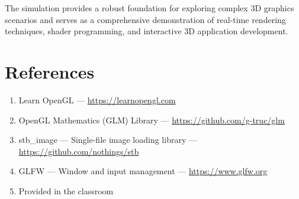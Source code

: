 \documentclass[12pt,a4paper]{article}
\begin{document}
The simulation provides a robust foundation for exploring complex 3D graphics scenarios and serves as a comprehensive demonstration of real-time rendering techniques, shader programming, and interactive 3D application development.

\section{References}

\begin{enumerate}
    \item Learn OpenGL --- \url{https://learnopengl.com}
    \item OpenGL Mathematics (GLM) Library --- \url{https://github.com/g-truc/glm}
    \item stb\_image --- Single-file image loading library --- \url{https://github.com/nothings/stb}
    \item GLFW --- Window and input management --- \url{https://www.glfw.org}
    \item Provided in the classroom
\end{enumerate}
\end{document}
